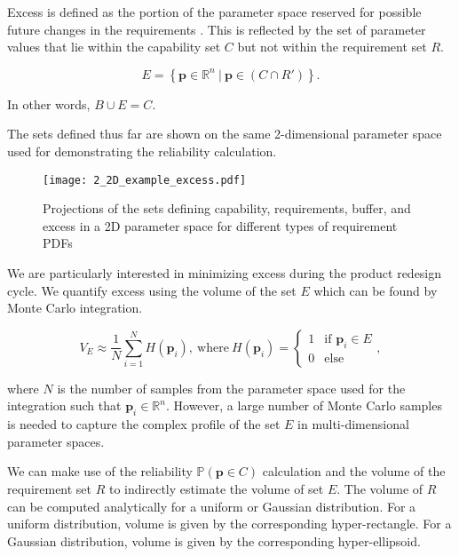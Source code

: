Excess is defined as the portion of the parameter space reserved for possible future changes in the requirements \cite{Eckert2019}. This is reflected by the set of parameter values that lie within the capability set $C$ but not within the requirement set $R$. 

\begin{equation} \label{eq:excess}
	\textit{E} = \left\{\mathbf{p} \in \mathbb{R}^n~|~\mathbf{p} \in \left(C\cap R'\right) \right\}.
\end{equation}

In other words, $B\cup E = C$.

The sets defined thus far are shown on the same 2-dimensional parameter space used for demonstrating the reliability calculation.

\begin{figure}[h!]
	\centering
	\texttt{[image: 2\_2D\_example\_excess.pdf]}
	\caption{Projections of the sets defining capability, requirements, buffer, and excess in a 2D parameter space for different types of requirement \acp{PDF}}
	\label{fig:2Dexampleexcess}
\end{figure}

We are particularly interested in minimizing excess during the product redesign cycle. We quantify excess using the volume of the set $E$ which can be found by Monte Carlo integration.

\begin{equation} \label{eq:excessmontecarlo}
	V_E \approx \dfrac{1}{N} {\sum\limits_{i=1}^{N} H\left(\mathbf{p}_i\right)}, ~\mathrm{where}~ H\left(\mathbf{p}_i\right)={\begin{cases}1&{\text{if }}\mathbf{p}_i\in E\\0&{\text{else}}\end{cases}},
\end{equation}

where $N$ is the number of samples from the parameter space used for the integration such that $\mathbf{p}_i \in \mathbb{R}^n$. However, a large number of Monte Carlo samples is needed to capture the complex profile of the set $E$ in multi-dimensional parameter spaces.

We can make use of the reliability $\mathbb{P}(\mathbf{p} \in C)$ calculation and the volume of the requirement set $R$ to indirectly estimate the volume of set $E$. The volume of $R$ can be computed analytically for a uniform or Gaussian distribution. For a uniform distribution, volume is given by the corresponding hyper-rectangle. For a Gaussian distribution, volume is given by the corresponding hyper-ellipsoid.

